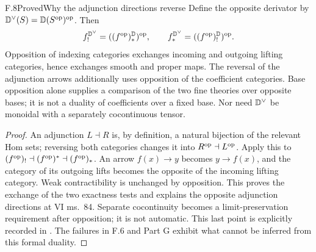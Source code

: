 \begin{claim}{F.8}{Proved}{Why the adjunction directions reverse}
Define the opposite derivator by $\mathbb D^\vee(S)=\mathbb D(S^{\mathrm{op}})^{\mathrm{op}}$. Then
\[
 f_!^{\mathbb D^\vee}=((f^{\mathrm{op}})_*^{\mathbb D})^{\mathrm{op}},\qquad
 f_*^{\mathbb D^\vee}=((f^{\mathrm{op}})_!^{\mathbb D})^{\mathrm{op}}.
\]
Opposition of indexing categories exchanges incoming and outgoing lifting categories, hence exchanges smooth and proper maps. The reversal of the adjunction arrows additionally uses opposition of the coefficient categories. Base opposition alone supplies a comparison of the two fine theories over opposite bases; it is not a duality of coefficients over a fixed base. Nor need $\mathbb D^\vee$ be monoidal with a separately cocontinuous tensor.
\end{claim}
\begin{proof}
An adjunction $L\dashv R$ is, by definition, a natural bijection of the relevant Hom sets; reversing both categories changes it into $R^{\mathrm{op}}\dashv L^{\mathrm{op}}$. Apply this to $(f^{\mathrm{op}})_!\dashv(f^{\mathrm{op}})^*\dashv(f^{\mathrm{op}})_*$. An arrow $f(x)\to y$ becomes $y\to f(x)$, and the category of its outgoing lifts becomes the opposite of the incoming lifting category. Weak contractibility is unchanged by opposition. This proves the exchange of the two exactness tests and explains the opposite adjunction directions at VI ms.~84. Separate cocontinuity becomes a limit-preservation requirement after opposition; it is not automatic. This last point is explicitly recorded in \citet[Example 3.28]{EFGPS2014b}. The failures in F.6 and Part G exhibit what cannot be inferred from this formal duality.
\end{proof}

